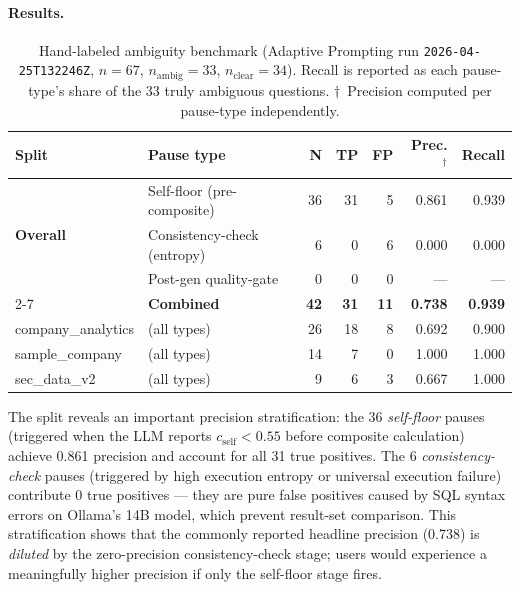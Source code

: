 \documentclass{article}
\begin{document}
\paragraph{Results.}

\begin{table}[h]
\centering
\caption{Hand-labeled ambiguity benchmark
  (Adaptive Prompting run \texttt{2026-04-25T132246Z}, $n{=}67$,
  $n_{\text{ambig}}{=}33$, $n_{\text{clear}}{=}34$).\footnotemark
  Recall is reported as each pause-type's share of the 33 truly ambiguous questions.
  $\dag$~Precision computed per pause-type independently.}
\label{tab:ambiguity}
\begin{tabular}{llrrrrr}
\toprule
\textbf{Split} & \textbf{Pause type} & \textbf{N} & \textbf{TP} & \textbf{FP} & \textbf{Prec.$^\dag$} & \textbf{Recall} \\
\midrule
\multirow{3}{*}{\textbf{Overall}} & Self-floor (pre-composite) & 36 & 31 & 5 & 0.861 & 0.939 \\
 & Consistency-check (entropy) & 6 & 0 & 6 & 0.000 & 0.000 \\
 & Post-gen quality-gate & 0 & 0 & 0 & --- & --- \\
\cmidrule{2-7}
 & \textbf{Combined} & \textbf{42} & \textbf{31} & \textbf{11} & \textbf{0.738} & \textbf{0.939} \\
\midrule
company\_analytics & (all types) & 26 & 18 & 8 & 0.692 & 0.900 \\
sample\_company    & (all types) & 14 & 7  & 0 & 1.000 & 1.000 \\
sec\_data\_v2      & (all types) & 9  & 6  & 3 & 0.667 & 1.000 \\
\bottomrule
\end{tabular}
\end{table}

The split reveals an important precision stratification: the 36 \emph{self-floor} pauses
(triggered when the LLM reports $c_{\text{self}} < 0.55$ before composite calculation)
achieve 0.861 precision and account for all 31 true positives.
The 6 \emph{consistency-check} pauses (triggered by high execution entropy or universal
execution failure) contribute 0 true positives --- they are pure false positives caused
by SQL syntax errors on Ollama's 14B model, which prevent result-set comparison.
This stratification shows that the commonly reported headline precision (0.738) is
\emph{diluted} by the zero-precision consistency-check stage; users would experience
a meaningfully higher precision if only the self-floor stage fires.
\end{document}
